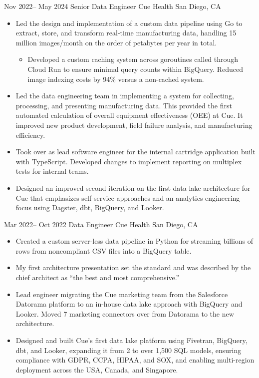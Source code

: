 \documentclass[10pt,legalpaper]{moderncv}
\begin{document}
\cventry
{Nov 2022-- May 2024  }
{Senior Data Engineer}
{Cue Health}
{San Diego, CA}
{}
{
    \begin{itemize}
        \item{Led the design and implementation of a custom data pipeline using Go to extract, store, and transform real-time manufacturing data, handling 15 million images/month on the order of petabytes per year in total.}
        \begin{itemize}
            \item{Developed a custom caching system across goroutines called through Cloud Run to ensure minimal query counts within BigQuery. Reduced image indexing costs by 94\% versus a non-cached system.}
        \end{itemize}
        \item{Led the data engineering team in implementing a system for collecting, processing, and presenting manufacturing data. This provided the first automated calculation of overall equipment effectiveness (OEE) at Cue. It improved new product development, field failure analysis, and manufacturing efficiency.}
        \item{Took over as lead software engineer for the internal cartridge application built with TypeScript. Developed changes to implement reporting on multiplex tests for internal teams.}
        \item{Designed an improved second iteration on the first data lake architecture for Cue that emphasizes self-service approaches and an analytics engineering focus using Dagster, dbt, BigQuery, and Looker.}
    \end{itemize}
}
\cventry
{Mar 2022-- Oct 2022  }
{Data Engineer}
{Cue Health}
{San Diego, CA}
{}
{
    \begin{itemize}
        \item{Created a custom server-less data pipeline in Python for streaming billions of rows from noncompliant CSV files into a BigQuery table.}
        \item{My first architecture presentation set the standard and was described by the chief architect as “the best and most comprehensive.”}
        \item{Lead engineer migrating the Cue marketing team from the Salesforce Datorama platform to an in-house data lake approach with BigQuery and Looker. Moved 7 marketing connectors over from Datorama to the new architecture.}
        \item{Designed and built Cue’s first data lake platform using Fivetran, BigQuery, dbt, and Looker, expanding it from 2 to over 1,500 SQL models, ensuring compliance with GDPR, CCPA, HIPAA, and SOX, and enabling multi-region deployment across the USA, Canada, and Singapore.}
    \end{itemize}
}
\end{document}
